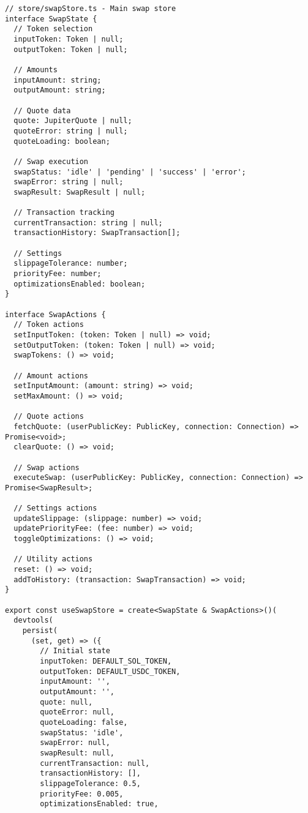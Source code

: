\documentclass[11pt,a4paper]{article}
\begin{document}
\begin{lstlisting}[style=typescript, caption=Zustand Store Implementation]
// store/swapStore.ts - Main swap store
interface SwapState {
  // Token selection
  inputToken: Token | null;
  outputToken: Token | null;
  
  // Amounts
  inputAmount: string;
  outputAmount: string;
  
  // Quote data
  quote: JupiterQuote | null;
  quoteError: string | null;
  quoteLoading: boolean;
  
  // Swap execution
  swapStatus: 'idle' | 'pending' | 'success' | 'error';
  swapError: string | null;
  swapResult: SwapResult | null;
  
  // Transaction tracking
  currentTransaction: string | null;
  transactionHistory: SwapTransaction[];
  
  // Settings
  slippageTolerance: number;
  priorityFee: number;
  optimizationsEnabled: boolean;
}

interface SwapActions {
  // Token actions
  setInputToken: (token: Token | null) => void;
  setOutputToken: (token: Token | null) => void;
  swapTokens: () => void;
  
  // Amount actions
  setInputAmount: (amount: string) => void;
  setMaxAmount: () => void;
  
  // Quote actions
  fetchQuote: (userPublicKey: PublicKey, connection: Connection) => Promise<void>;
  clearQuote: () => void;
  
  // Swap actions
  executeSwap: (userPublicKey: PublicKey, connection: Connection) => Promise<SwapResult>;
  
  // Settings actions
  updateSlippage: (slippage: number) => void;
  updatePriorityFee: (fee: number) => void;
  toggleOptimizations: () => void;
  
  // Utility actions
  reset: () => void;
  addToHistory: (transaction: SwapTransaction) => void;
}

export const useSwapStore = create<SwapState & SwapActions>()(
  devtools(
    persist(
      (set, get) => ({
        // Initial state
        inputToken: DEFAULT_SOL_TOKEN,
        outputToken: DEFAULT_USDC_TOKEN,
        inputAmount: '',
        outputAmount: '',
        quote: null,
        quoteError: null,
        quoteLoading: false,
        swapStatus: 'idle',
        swapError: null,
        swapResult: null,
        currentTransaction: null,
        transactionHistory: [],
        slippageTolerance: 0.5,
        priorityFee: 0.005,
        optimizationsEnabled: true,
        

\end{lstlisting}
\end{document}
